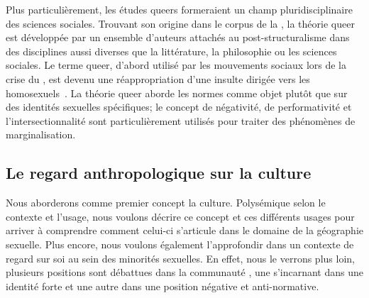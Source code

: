 Plus particulièrement, les études queers formeraient un champ pluridisciplinaire des sciences sociales. 
Trouvant son origine dans le corpus de la , la théorie queer est développée par un ensemble d'auteurs attachés au post-structuralisme dans des disciplines aussi diverses que la littérature, la philosophie ou les sciences sociales. 
Le terme queer, d'abord utilisé par les mouvements sociaux \lgbt{} lors de la crise du \sida, est devenu une réappropriation d'une insulte dirigée vers les homosexuels~\citep{Laprade2014}.
La théorie queer aborde les normes  comme objet plutôt que sur des identités sexuelles spécifiques; le concept de négativité, de performativité et l'intersectionnalité sont particulièrement utilisés pour traiter des phénomènes de marginalisation.

\subsection{Le regard anthropologique sur la culture}
\label{subsec:le_regard_anthropologique_sur_la_culture} 
Nous aborderons comme premier concept la culture.
Polysémique selon le contexte et l'usage, nous voulons décrire ce concept et ces différents usages pour arriver à comprendre comment celui-ci s'articule dans le domaine de la géographie sexuelle.
Plus encore, nous voulons également l'approfondir dans un contexte de regard sur soi au sein des minorités sexuelles. 
En effet, nous le verrons plus loin, plusieurs positions sont débattues dans la communauté \lgbt{}, une s'incarnant dans une identité forte et une autre dans une position négative et anti-normative.


